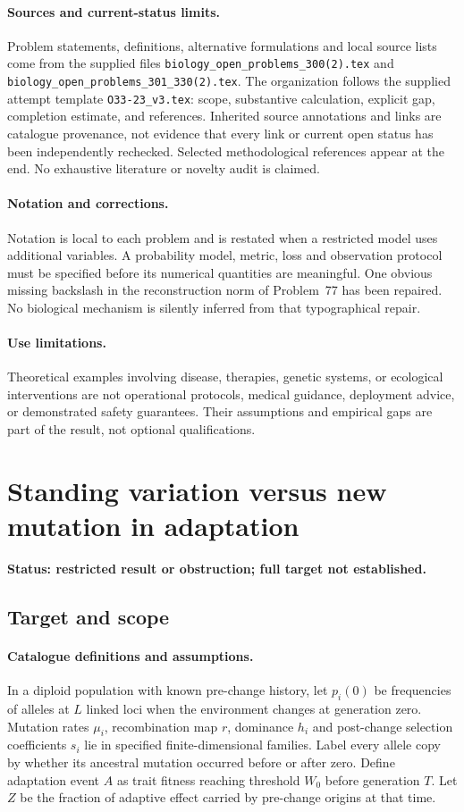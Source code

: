 \documentclass[11pt]{article}
\begin{document}
\paragraph{Sources and current-status limits.}
Problem statements, definitions, alternative formulations and local source lists
come from the supplied files
\texttt{biology\_open\_problems\_300(2).tex} and
\texttt{biology\_open\_problems\_301\_330(2).tex}.
The organization follows the supplied attempt template
\texttt{O33-23\_v3.tex}: scope, substantive calculation, explicit gap,
completion estimate, and references. Inherited source annotations and links are
catalogue provenance, not evidence that every link or current open status has
been independently rechecked. Selected methodological references appear at the
end. No exhaustive literature or novelty audit is claimed.

\paragraph{Notation and corrections.}
Notation is local to each problem and is restated when a restricted model uses
additional variables. A probability model, metric, loss and observation protocol
must be specified before its numerical quantities are meaningful. One obvious
missing backslash in the reconstruction norm of Problem~77 has been repaired.
No biological mechanism is silently inferred from that typographical repair.

\paragraph{Use limitations.}
Theoretical examples involving disease, therapies, genetic systems, or ecological
interventions are not operational protocols, medical guidance, deployment advice,
or demonstrated safety guarantees. Their assumptions and empirical gaps are part
of the result, not optional qualifications.


\section*{Standing variation versus new mutation in adaptation}
\label{prob:159}
\noindent\textbf{Status: restricted result or obstruction; full target not established.}
\subsection{Target and scope}
\paragraph{Catalogue definitions and assumptions.}
In a diploid population with known pre-change history, let $p_i(0)$ be frequencies of alleles at $L$ linked loci when the environment changes at generation zero. Mutation rates $\mu_i$, recombination map $r$, dominance $h_i$ and post-change selection coefficients $s_i$ lie in specified finite-dimensional families. Label every allele copy by whether its ancestral mutation occurred before or after zero. Define adaptation event $A$ as trait fitness reaching threshold $W_0$ before generation $T$. Let $Z$ be the fraction of adaptive effect carried by pre-change origins at that time.
\end{document}
